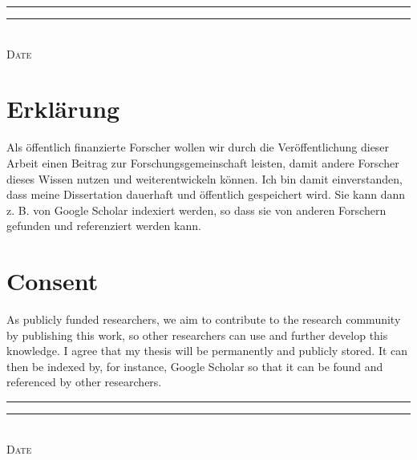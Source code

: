 \makeatletter
\vspace{2cm}
\rule{4cm}{0.1pt} \hfill \rule{7cm}{0.1pt} \\
\hspace*{1.5cm} \textsc{Date} \hspace*{7cm} \textsc{\@author}
\makeatother

\cleardoublepage

\section*{Erklärung}
{
Als öffentlich finanzierte Forscher wollen wir durch die Veröffentlichung dieser Arbeit einen Beitrag zur Forschungsgemeinschaft leisten, damit andere Forscher dieses Wissen nutzen und weiterentwickeln können. Ich bin damit einverstanden, dass meine Dissertation dauerhaft und öffentlich gespeichert wird. Sie kann dann z. B. von Google Scholar indexiert werden, so dass sie von anderen Forschern gefunden und referenziert werden kann.}

\section*{Consent}
As publicly funded researchers, we aim to contribute to the research community by publishing this work, so other researchers can use and further develop this knowledge. I agree that my thesis will be permanently and publicly stored. It can then be indexed by, for instance, Google Scholar so that it can be found and referenced by other researchers.

\makeatletter
\vspace{2cm}
\rule{4cm}{0.1pt} \hfill \rule{7cm}{0.1pt} \\
\hspace*{1.5cm} \textsc{Date} \hspace*{7cm} \textsc{\@author}
\makeatother

\cleardoublepage

\pagestyle{scrheadings} %

\tableofcontents

\cleardoublepage
